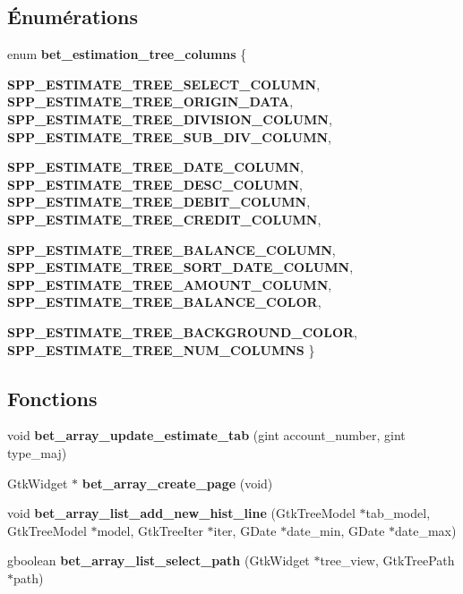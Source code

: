 \subsection*{Énumérations}
\begin{DoxyCompactItemize}
\item 
enum {\bf bet\_\-estimation\_\-tree\_\-columns} \{ \par
{\bf SPP\_\-ESTIMATE\_\-TREE\_\-SELECT\_\-COLUMN}, 
{\bf SPP\_\-ESTIMATE\_\-TREE\_\-ORIGIN\_\-DATA}, 
{\bf SPP\_\-ESTIMATE\_\-TREE\_\-DIVISION\_\-COLUMN}, 
{\bf SPP\_\-ESTIMATE\_\-TREE\_\-SUB\_\-DIV\_\-COLUMN}, 
\par
{\bf SPP\_\-ESTIMATE\_\-TREE\_\-DATE\_\-COLUMN}, 
{\bf SPP\_\-ESTIMATE\_\-TREE\_\-DESC\_\-COLUMN}, 
{\bf SPP\_\-ESTIMATE\_\-TREE\_\-DEBIT\_\-COLUMN}, 
{\bf SPP\_\-ESTIMATE\_\-TREE\_\-CREDIT\_\-COLUMN}, 
\par
{\bf SPP\_\-ESTIMATE\_\-TREE\_\-BALANCE\_\-COLUMN}, 
{\bf SPP\_\-ESTIMATE\_\-TREE\_\-SORT\_\-DATE\_\-COLUMN}, 
{\bf SPP\_\-ESTIMATE\_\-TREE\_\-AMOUNT\_\-COLUMN}, 
{\bf SPP\_\-ESTIMATE\_\-TREE\_\-BALANCE\_\-COLOR}, 
\par
{\bf SPP\_\-ESTIMATE\_\-TREE\_\-BACKGROUND\_\-COLOR}, 
{\bf SPP\_\-ESTIMATE\_\-TREE\_\-NUM\_\-COLUMNS}
 \}
\end{DoxyCompactItemize}
\subsection*{Fonctions}
\begin{DoxyCompactItemize}
\item 
void {\bf bet\_\-array\_\-update\_\-estimate\_\-tab} (gint account\_\-number, gint type\_\-maj)
\item 
GtkWidget $\ast$ {\bf bet\_\-array\_\-create\_\-page} (void)
\item 
void {\bf bet\_\-array\_\-list\_\-add\_\-new\_\-hist\_\-line} (GtkTreeModel $\ast$tab\_\-model, GtkTreeModel $\ast$model, GtkTreeIter $\ast$iter, GDate $\ast$date\_\-min, GDate $\ast$date\_\-max)
\item 
gboolean {\bf bet\_\-array\_\-list\_\-select\_\-path} (GtkWidget $\ast$tree\_\-view, GtkTreePath $\ast$path)
\end{DoxyCompactItemize}
